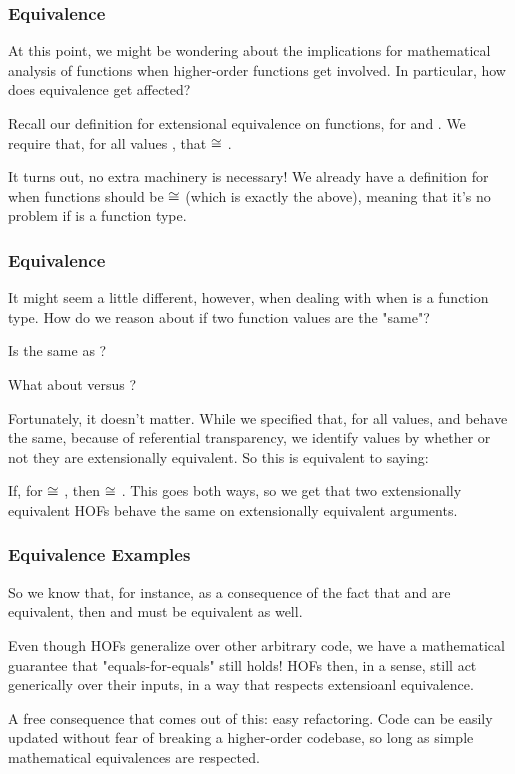 \documentclass[aspectratio=169]{beamer}
\begin{document}

\begin{frame}[fragile]
  \frametitle{Equivalence}

  At this point, we might be wondering about the implications for mathematical
  analysis of functions when higher-order functions get involved. In particular,
  how does equivalence get affected?

  Recall our definition for extensional equivalence on functions, for 
  and . We require that, for all values , that
   $\cong$ . 

  It turns out, no extra machinery is necessary! We already have a definition for 
  when functions should be $\cong$ (which is exactly the above), meaning that it's
  no problem if  is a function type. 
\end{frame}

\begin{frame}[fragile]
  \frametitle{Equivalence}

  It might seem a little different, however, when dealing with when  is 
  a function type. How do we reason about if two function values are the "same"?
  
  Is  the same as ? 

  What about  versus ?

  Fortunately, it doesn't matter. While we specified that, for all values, 
  and  behave the same, because of referential transparency, we identify values
  by whether or not they are extensionally equivalent. So this is equivalent to saying:

  If, for  $\cong$ , then  $\cong$ . This goes
  both ways, so we get that two extensionally equivalent HOFs behave the same on
  extensionally equivalent arguments.
\end{frame}


\begin{frame}[fragile]
  \frametitle{Equivalence Examples}

  So we know that, for instance, as a consequence of the fact that 
  and  are equivalent, then  and 
   must be equivalent as well.

  Even though HOFs generalize over other arbitrary code, we have a mathematical guarantee
  that "equals-for-equals" still holds! HOFs then, in a sense, still act generically over
  their inputs, in a way that respects extensioanl equivalence.

  A free consequence that comes out of this: easy refactoring. Code can be easily
  updated without fear of breaking a higher-order codebase, so long as simple
  mathematical equivalences are respected.\footnotemark

\end{frame}
\end{document}
